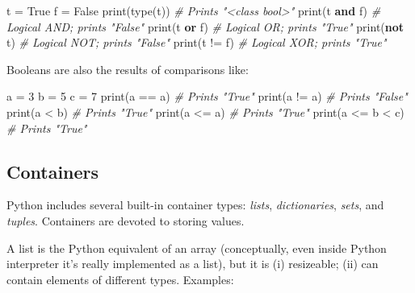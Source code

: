 \documentclass[
]{article}
\newenvironment{Shaded}{}{}
\newcommand{\BuiltInTok}[1]{#1}
\newcommand{\CommentTok}[1]{\textcolor[rgb]{0.38,0.63,0.69}{\textit{#1}}}
\newcommand{\DecValTok}[1]{\textcolor[rgb]{0.25,0.63,0.44}{#1}}
\newcommand{\KeywordTok}[1]{\textcolor[rgb]{0.00,0.44,0.13}{\textbf{#1}}}
\newcommand{\NormalTok}[1]{#1}
\newcommand{\OperatorTok}[1]{\textcolor[rgb]{0.40,0.40,0.40}{#1}}
\newcommand{\VariableTok}[1]{\textcolor[rgb]{0.10,0.09,0.49}{#1}}
\begin{document}
\begin{Shaded}
\begin{Highlighting}[]
\NormalTok{t }\OperatorTok{=} \VariableTok{True}
\NormalTok{f }\OperatorTok{=} \VariableTok{False}
\BuiltInTok{print}\NormalTok{(}\BuiltInTok{type}\NormalTok{(t)) }\CommentTok{\# Prints "\textless{}class \textquotesingle{}bool\textquotesingle{}\textgreater{}"}
\BuiltInTok{print}\NormalTok{(t }\KeywordTok{and}\NormalTok{ f) }\CommentTok{\# Logical AND; prints "False"}
\BuiltInTok{print}\NormalTok{(t }\KeywordTok{or}\NormalTok{ f)  }\CommentTok{\# Logical OR; prints "True"}
\BuiltInTok{print}\NormalTok{(}\KeywordTok{not}\NormalTok{ t)   }\CommentTok{\# Logical NOT; prints "False"}
\BuiltInTok{print}\NormalTok{(t }\OperatorTok{!=}\NormalTok{ f)  }\CommentTok{\# Logical XOR; prints "True"}
\end{Highlighting}
\end{Shaded}

Booleans are also the results of comparisons like:

\begin{Shaded}
\begin{Highlighting}[]
\NormalTok{a }\OperatorTok{=} \DecValTok{3}
\NormalTok{b }\OperatorTok{=} \DecValTok{5}
\NormalTok{c }\OperatorTok{=} \DecValTok{7}
\BuiltInTok{print}\NormalTok{(a }\OperatorTok{==}\NormalTok{ a)     }\CommentTok{\# Prints "True"}
\BuiltInTok{print}\NormalTok{(a }\OperatorTok{!=}\NormalTok{ a)     }\CommentTok{\# Prints "False"}
\BuiltInTok{print}\NormalTok{(a }\OperatorTok{\textless{}}\NormalTok{ b)      }\CommentTok{\# Prints "True"}
\BuiltInTok{print}\NormalTok{(a }\OperatorTok{\textless{}=}\NormalTok{ a)     }\CommentTok{\# Prints "True"}
\BuiltInTok{print}\NormalTok{(a }\OperatorTok{\textless{}=}\NormalTok{ b }\OperatorTok{\textless{}}\NormalTok{ c) }\CommentTok{\# Prints "True"}
\end{Highlighting}
\end{Shaded}

\hypertarget{containers}{%
\subsection{Containers}\label{containers}}

Python includes several built-in container types: \emph{lists},
\emph{dictionaries}, \emph{sets}, and \emph{tuples}. Containers are
devoted to storing values.

A list is the Python equivalent of an array (conceptually, even inside
Python interpreter it's really implemented as a list), but it is (i)
resizeable; (ii) can contain elements of different types. Examples:
\end{document}
